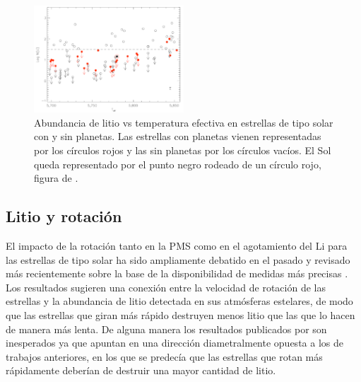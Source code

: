 \begin{figure}
	\centering
	\includegraphics[width=0.5\textwidth]{img/tesis/li_abundances_planets.pdf}
	\caption{Abundancia de litio vs temperatura efectiva en estrellas de tipo solar con y sin planetas. Las estrellas con planetas vienen representadas por los círculos rojos y las sin planetas por los círculos vacíos. El Sol queda representado por el punto negro rodeado de un círculo rojo, figura de \cite{Israelian2009}.}
	\label{fig:li_abundances_planets}
\end{figure}


\subsection{Litio y rotación}
El impacto de la rotación tanto en la PMS como en el agotamiento del Li para las estrellas de tipo solar ha sido ampliamente debatido en el pasado \citep{Pinsonneault1997,Jeffries2004,Somers2014} y revisado más recientemente sobre la base de la disponibilidad de medidas más precisas \citep{Bouvier2016}. Los resultados sugieren una conexión entre la velocidad de rotación de las estrellas y la abundancia de litio detectada en sus atmósferas estelares, de modo que las estrellas que giran más rápido destruyen menos litio que las que lo hacen de manera más lenta. De alguna manera los resultados publicados por \cite{Bouvier2016} son inesperados ya que apuntan en una dirección diametralmente opuesta a los de trabajos anteriores, en los que se predecía que las estrellas que rotan más rápidamente deberían de destruir una mayor cantidad de litio.\par 

